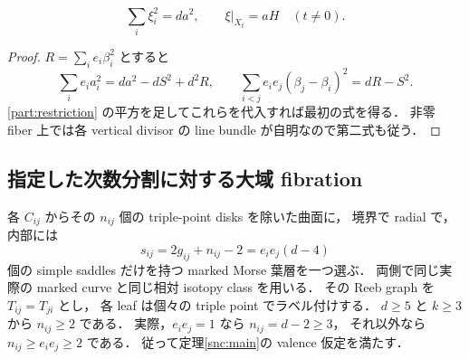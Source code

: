 \begin{corollary}
\label{part:volume}
\[
 \sum_i\xi_i^2=da^2,\qquad \xi|_{X_t}=aH\quad(t\ne0).
\]
\end{corollary}
\begin{proof}
$R=\sum_i e_i\beta_i^2$ とすると
\[
 \sum_i e_i a_i^2=da^2-dS^2+d^2R,\qquad
 \sum_{i<j}e_i e_j(\beta_j-\beta_i)^2=dR-S^2.
\]
\eqref{part:restriction} の平方を足してこれらを代入すれば最初の式を得る．
非零 fiber 上では各 vertical divisor の line bundle が自明なので第二式も従う．
\end{proof}

\subsection{指定した次数分割に対する大域 fibration}

各 $C_{ij}$ からその $n_{ij}$ 個の triple-point disks を除いた曲面に，
境界で radial で，内部には
\begin{equation}\label{part:saddle-count}
 s_{ij}=2g_{ij}+n_{ij}-2=e_i e_j(d-4)
\end{equation}
個の simple saddles だけを持つ marked Morse 葉層を一つ選ぶ．
両側で同じ実際の marked curve と同じ相対 isotopy class を用いる．
その Reeb graph を $T_{ij}=T_{ji}$ とし，
各 leaf は個々の triple point でラベル付けする．
$d\geq5$ と $k\geq3$ から $n_{ij}\geq2$ である．
実際，$e_i e_j=1$ なら $n_{ij}=d-2\geq3$，
それ以外なら $n_{ij}\geq e_i e_j\geq2$ である．
従って定理\ref{snc:main}の valence 仮定を満たす．

